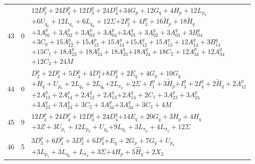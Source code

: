 \documentclass[11pt,a4paper]{article}
\theoremstyle{remark}
\begin{document}
\begin{longtable}{rrp{12.7cm}}
43&0&\( 12D_3^p + 24D_4^p + 12D_3^q + 24D_4^q \)\newline\( + 34G_p + 12G_q + 4H_p + 12L_{p_{8}} \)\newline\( + 6U_{q_{0}} + 12L_{q_{5}} + 6L_{q_{8}} + 12\Sigma \)\newline\( + 2I_2^p + 4I_3^p + 16\widetilde H_p + 18\widetilde H_q \)\newline\( + 3A_{01}^p + 3A_{02}^p + 3A_{03}^p + 3A_{04}^p \)\newline\( + 3A_{01}^q + 3A_{02}^q + 3A_{03}^q + 3B_{04}^q \)\newline\( + 3C_0 + 15A_{12}^p + 15A_{13}^p + 15A_{14}^p \)\newline\( + 15A_{12}^q + 15A_{13}^q + 12A_{14}^q + 3B_{14}^q \)\newline\( + 15C_1 + 18A_{23}^p + 18A_{24}^p + 18A_{23}^q \)\newline\( + 18A_{24}^q + 18C_2 + 12A_{34}^p + 12A_{34}^q \)\newline\( + 12C_3 + 24M \)\\[3pt]
44&0&\( D_2^p + 2D_3^p + 5D_4^p + 4D_3^q \)\newline\( + 8D_4^q + 2E_q + 4G_p + 10G_q \)\newline\( + H_q + U_{p_{0}} + 2L_{q_{7}} + 2L_{q_{8}} \)\newline\( + 2L_{\pi_p} + 2\Sigma + I_1^p + 3\widetilde H_p \)\newline\( + I_3^q + 2I_4^q + 2\widetilde H_q + 2A_{12}^p \)\newline\( + 2A_{13}^p + 2A_{14}^p + 2A_{12}^q + 2A_{13}^q \)\newline\( + 2A_{14}^q + 2C_1 + 3A_{23}^p + 3A_{24}^p \)\newline\( + 3A_{23}^q + 3A_{24}^q + 3C_2 + 3A_{34}^p \)\newline\( + 3A_{34}^q + 3C_3 + 4M \)\\[3pt]
45&9&\( 12D_3^p + 24D_4^p + 12D_3^q + 24D_4^q \)\newline\( + 14E_q + 20G_q + 3H_p + 4H_q \)\newline\( + 3Z + 3U_{p_{1}} + 12L_{p_{8}} + U_{q_{0}} \)\newline\( + 9L_{q_{5}} + 3L_{\pi_p} + 4L_{\sigma_q} + 12\Sigma \)\\[3pt]
46&5&\( 3D_3^p + 6D_4^p + 3D_3^q + 6D_4^q \)\newline\( + E_q + 2G_p + 7G_q + U_{p_{0}} \)\newline\( + 3L_{p_{5}} + 3L_{q_{8}} + L_{\sigma_p} + 3\Sigma \)\newline\( + 4\widehat H_p + 5\widehat H_q + 2X_2 \)\\[3pt]

\end{longtable}
\end{document}
